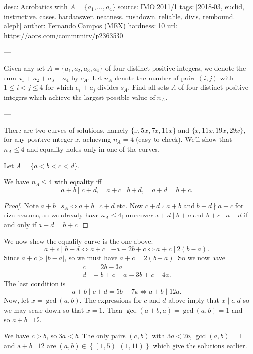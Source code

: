 desc: Acrobatics with $A=\{a_1, \dots, a_4\}$
source: IMO 2011/1
tags: [2018-03, euclid, instructive, cases, hardanswer, neatness, rushdown, reliable,
  divis, rembound, aleph]
author: Fernando Campos (MEX)
hardness: 10
url: https://aops.com/community/p2363530

---

Given any set $A = \{a_1, a_2, a_3, a_4\}$ of four distinct
positive integers, we denote the sum $a_1+a_2+a_3+a_4$ by $s_A$.
Let $n_A$ denote the number of pairs $(i,j)$ with $1 \le i < j \le 4$
for which $a_i + a_j$ divides $s_A$.
Find all sets $A$ of four distinct positive integers which achieve
the largest possible value of $n_A$.

---

There are two curves of solutions,
namely $\{x,5x,7x,11x\}$ and $\{x,11x,19x,29x\}$,
for any positive integer $x$,
achieving $n_A = 4$ (easy to check).
We'll show that $n_A \le 4$
and equality holds only in one of the curves.

Let $A = \{a < b < c < d\}$.
\begin{claim*}
  We have $n_A \le 4$ with equality iff
  \[ a+b \mid c+d, \quad a+c \mid b+d, \quad a+d = b+c. \]
\end{claim*}
\begin{proof}
Note $a+b \mid s_A \iff a+b \mid c+d$ etc.
Now $c+d \nmid a+b$ and $b+d \nmid a+c$ for size reasons,
so we already have $n_A \le 4$;
moreover $a+d \mid b+c$ and $b+c \mid a+d$
if and only if $a+d = b+c$.
\end{proof}

We now show the equality curve is the one above.
\[ a+c  \mid b+d \iff a+c \mid -a+2b+c \iff a+c \mid 2(b-a). \]
Since $a+c > |b-a|$, so we must have $a+c=2(b-a)$.
So we now have
\begin{align*}
  c &= 2b-3a \\
  d &= b+c-a = 3b+c-4a.
\end{align*}
The last condition is
\[ a+b \mid c+d = 5b-7a \iff a+b \mid 12a. \]
Now, let $x = \gcd(a,b)$.
The expressions for $c$ and $d$ above imply that
$x \mid c,d$ so we may scale down so that $x = 1$.
Then $\gcd(a+b,a) = \gcd(a,b) = 1$ and so $a+b \mid 12$.

We have $c > b$, so $3a < b$.
The only pairs $(a,b)$ with $3a < 2b$, $\gcd(a,b) = 1$
and $a+b \mid 12$
are $(a,b) \in \left\{ (1,5), (1,11) \right\}$
which give the solutions earlier.
